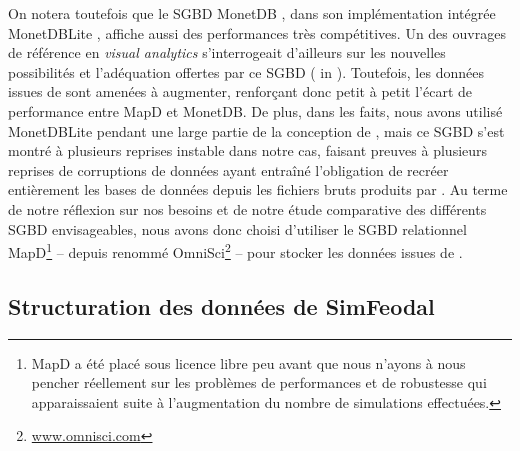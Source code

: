 On notera toutefois que le SGBD MonetDB \autocite{vermeij_monetdb_2008}, dans son implémentation intégrée MonetDBLite \autocite{raasveldt_monetdblite_2018}, affiche aussi des performances très compétitives.
Un des ouvrages de référence en \textit{visual analytics} s'interrogeait d'ailleurs sur les nouvelles possibilités et l'adéquation offertes par ce SGBD (\cite[105]{fekete_infrastructure_2010} in \cite{keim_mastering_2010}).
Toutefois, les données issues de \simfeodal{} sont amenées à augmenter, renforçant donc petit à petit l'écart de performance entre MapD et MonetDB.
De plus, dans les faits, nous avons utilisé MonetDBLite pendant une large partie de la conception de \simedb{}, mais ce SGBD s'est montré à plusieurs reprises instable dans notre cas, faisant preuves à plusieurs reprises de corruptions de données ayant entraîné l'obligation de recréer entièrement les bases de données depuis les fichiers bruts produits par \simfeodal{}.
Au terme de notre réflexion sur nos besoins et de notre étude comparative des différents SGBD envisageables, nous avons donc choisi d'utiliser le SGBD relationnel MapD\footnote{
	MapD a été placé sous licence libre peu avant que nous n'ayons à nous pencher réellement sur les problèmes de performances et de robustesse qui apparaissaient suite à l'augmentation du nombre de simulations effectuées.
} -- depuis renommé OmniSci\footnote{
	\href{https://www.omnisci.com/}{www.omnisci.com}
} -- pour stocker les données issues de \simfeodal{}. 

\subsection{Structuration des données de SimFeodal}


